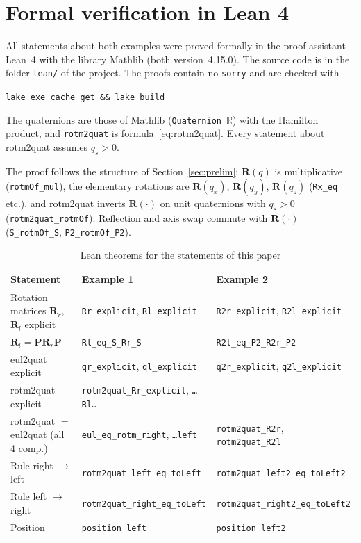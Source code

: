 \documentclass{article}
\theoremstyle{plain}
\theoremstyle{definition}
\newcommand{\R}{\mathbb{R}}
\newcommand{\vect}[1]{\boldsymbol{#1}}
\newcommand{\lean}[1]{\texttt{#1}}
\begin{document}
\section{Formal verification in Lean 4}\label{sec:lean}

All statements about both examples were proved formally in the proof assistant Lean~4
\cite{lean4} with the library Mathlib \cite{mathlib} (both version~4.15.0). The source code is in
the folder \texttt{lean/} of the project. The proofs contain no \lean{sorry} and are checked with
\begin{center}
  \texttt{lake exe cache get \&\& lake build}
\end{center}
The quaternions are those of Mathlib (\texttt{Quaternion}~$\R$) with the Hamilton product, and
\lean{rotm2quat} is formula~\eqref{eq:rotm2quat}. Every statement about rotm2quat assumes
$q_s > 0$.

{\sloppy The proof follows the structure of Section~\ref{sec:prelim}: $\vect R(q)$ is multiplicative
(\lean{rotmOf\_mul}), the elementary rotations are $\vect R(q_x)$, $\vect R(q_y)$, $\vect R(q_z)$
(\lean{Rx\_eq} etc.), and rotm2quat inverts $\vect R(\cdot)$ on unit quaternions with $q_s > 0$
(\lean{rotm2quat\_rotmOf}). Reflection and axis swap commute with $\vect R(\cdot)$
(\lean{S\_rotmOf\_S}, \lean{P2\_rotmOf\_P2}).\par}

\begin{table}[H]
  \centering
  \footnotesize
  \begin{tabular}{@{}lll@{}}
    \toprule
    Statement & Example 1 & Example 2 \\
    \midrule
    Rotation matrices $\vect R_r$, $\vect R_l$ explicit & \lean{Rr\_explicit}, \lean{Rl\_explicit} & \lean{R2r\_explicit}, \lean{R2l\_explicit} \\
    $\vect R_l = \vect P \vect R_r \vect P$ & \lean{Rl\_eq\_S\_Rr\_S} & \lean{R2l\_eq\_P2\_R2r\_P2} \\
    eul2quat explicit & \lean{qr\_explicit}, \lean{ql\_explicit} & \lean{q2r\_explicit}, \lean{q2l\_explicit} \\
    rotm2quat explicit & \lean{rotm2quat\_Rr\_explicit}, \lean{\dots Rl\dots} & -- \\
    rotm2quat $=$ eul2quat (all 4 comp.) & \lean{eul\_eq\_rotm\_right}, \lean{\dots left} & \lean{rotm2quat\_R2r}, \lean{rotm2quat\_R2l} \\
    Rule right $\to$ left & \lean{rotm2quat\_left\_eq\_toLeft} & \lean{rotm2quat\_left2\_eq\_toLeft2} \\
    Rule left $\to$ right & \lean{rotm2quat\_right\_eq\_toLeft} & \lean{rotm2quat\_right2\_eq\_toLeft2} \\
    Position & \lean{position\_left} & \lean{position\_left2} \\
    \bottomrule
  \end{tabular}
  \caption{Lean theorems for the statements of this paper}
  \label{tab:lean}
\end{table}
\end{document}
